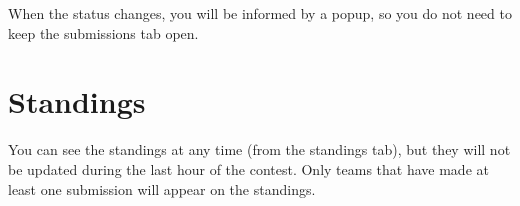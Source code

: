 \documentclass[a4paper]{article}
\begin{document}
When the status changes, you will be informed by a popup, so you do not
need to keep the submissions tab open.

\section{Standings}
You can see the standings at any time (from the standings tab), but
they will not be updated during the last hour of the contest. Only
teams that have made at least one submission will appear on the
standings.
\end{document}
